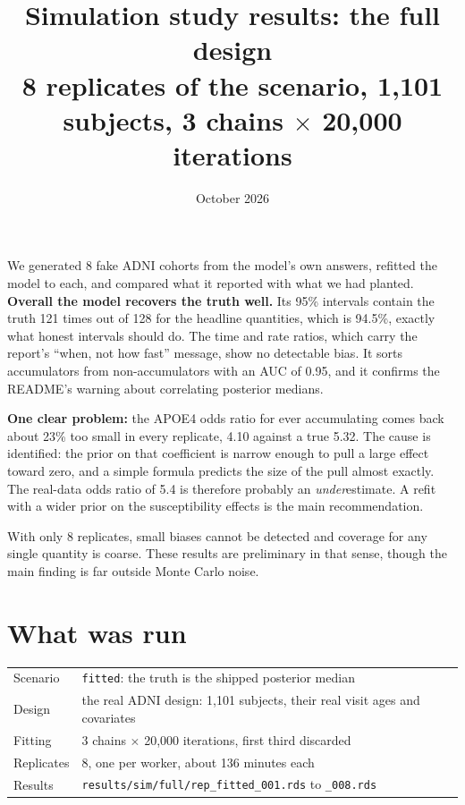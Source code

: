 \documentclass[11pt]{article}
\title{\textbf{Simulation study results: the full design}\\[4pt]
\large 8 replicates of the \code{fitted} scenario, 1,101 subjects, 3 chains $\times$ 20,000 iterations}
\date{October 2026}
\author{}
\newcommand{\code}[1]{\texttt{\small #1}}
\begin{document}
\maketitle
\vspace{-2.2em}

\begin{plain}[Summary]
We generated 8 fake ADNI cohorts from the model's own answers, refitted the model to each, and compared what it reported with what we had planted. \textbf{Overall the model recovers the truth well.} Its 95\% intervals contain the truth 121 times out of 128 for the headline quantities, which is 94.5\%, exactly what honest intervals should do. The time and rate ratios, which carry the report's ``when, not how fast'' message, show no detectable bias. It sorts accumulators from non-accumulators with an AUC of 0.95, and it confirms the README's warning about correlating posterior medians.

\textbf{One clear problem:} the APOE4 odds ratio for ever accumulating comes back about 23\% too small in every replicate, 4.10 against a true 5.32. The cause is identified: the prior on that coefficient is narrow enough to pull a large effect toward zero, and a simple formula predicts the size of the pull almost exactly. The real-data odds ratio of 5.4 is therefore probably an \emph{under}estimate. A refit with a wider prior on the susceptibility effects is the main recommendation.

With only 8 replicates, small biases cannot be detected and coverage for any single quantity is coarse. These results are preliminary in that sense, though the main finding is far outside Monte Carlo noise.
\end{plain}

\section{What was run}

\begin{center}
\small
\begin{tabular}{@{}l l@{}}
\toprule
Scenario & \code{fitted}: the truth is the shipped posterior median \\
Design & the real ADNI design: 1,101 subjects, their real visit ages and covariates \\
Fitting & 3 chains $\times$ 20,000 iterations, first third discarded \\
Replicates & 8, one per worker, about 136 minutes each \\
Results & \code{results/sim/full/rep\_fitted\_001.rds} to \code{\_008.rds} \\
\bottomrule
\end{tabular}
\end{center}
\end{document}
